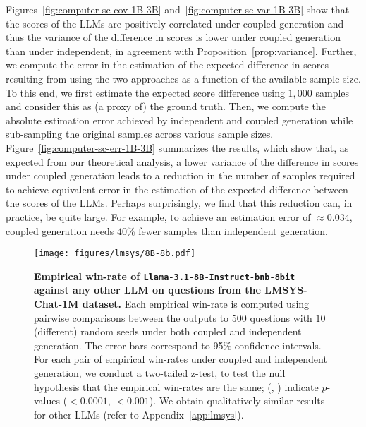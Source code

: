 %
Figures~\ref{fig:computer-sc-cov-1B-3B} and~\ref{fig:computer-sc-var-1B-3B} show that the scores of the LLMs are positively correlated under coupled generation and thus the variance of the difference in scores is lower under coupled generation than under independent, in agreement with Proposition~\ref{prop:variance}.
% 
Further, we compute the error in the estimation of the expected difference in scores resulting from using the two approaches as a function of the available sample size. To this end, we first estimate the expected score difference using $1{,}000$ samples and consider this as (a proxy of) the ground truth. Then, we compute the absolute estimation error achieved by independent and coupled generation while sub-sampling the original samples across various sample sizes.
% 
Figure~\ref{fig:computer-sc-err-1B-3B} summarizes the results, which show that, as expected from our theoretical analysis, a lower variance of the difference in scores under coupled generation leads to a reduction in the number of samples required to achieve equivalent error in the estimation of the expected difference between the scores of the LLMs.
% 
Perhaps surprisingly, we find that this reduction can, in practice, be quite large. For example, to achieve an estimation error of $\approx$$0.034$, coupled generation needs $40$\% fewer samples than independent generation. 


\begin{figure}[h]
\centering
\texttt{[image: figures/lmsys/8B-8b.pdf]}
%
\caption{
\textbf{Empirical win-rate of \texttt{Llama-3.1-8B-Instruct-bnb-8bit} against any other LLM on questions from the LMSYS-Chat-1M dataset.} 
%
%
Each empirical win-rate is computed using 
pairwise comparisons between the outputs 
to $500$ questions with $10$ (different) random seeds under both coupled and independent generation. 
%
The error bars correspond to 95\% confidence intervals. For each pair of empirical win-rates under coupled and independent generation, we conduct a two-tailed z-test, to test the null hypothesis that the empirical win-rates are the same; (\fourstars, \threestars) indicate $p$-values ($<0.0001$, $< 0.001$). We obtain qualitatively similar results for other LLMs (refer to Appendix~\ref{app:lmsys}).
}
\label{fig:win_rate}
\end{figure}

